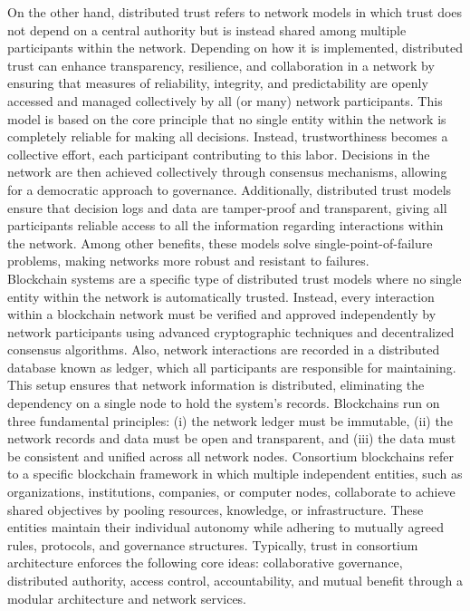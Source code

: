 \documentclass[conference]{IEEEtran}
\begin{document}
On the other hand, distributed trust refers to network models in which trust does not depend on a central authority but is instead shared among multiple participants within the network. Depending on how it is implemented, distributed trust can enhance transparency, resilience, and collaboration in a network by ensuring that measures of reliability, integrity, and predictability are openly accessed and managed collectively by all (or many) network participants. This model is based on the core principle that no single entity within the network is completely reliable for making all decisions. Instead, trustworthiness becomes a collective effort, each participant contributing to this labor. Decisions in the network are then achieved collectively through consensus mechanisms, allowing for a democratic approach to governance. Additionally, distributed trust models ensure that decision logs and data are tamper-proof and transparent, giving all participants reliable access to all the information regarding interactions within the network. Among other benefits, these models solve single-point-of-failure problems, making networks more robust and resistant to failures. \\

Blockchain systems are a specific type of distributed trust models where no single entity within the network is automatically trusted. Instead, every interaction within a blockchain network must be verified and approved independently by network participants using advanced cryptographic techniques and decentralized consensus algorithms. Also, network interactions are recorded in a distributed database known as ledger, which all participants are responsible for maintaining. This setup ensures that network information is distributed, eliminating the dependency on a single node to hold the system's records. Blockchains run on three fundamental principles: (i) the network ledger must be immutable, (ii) the network records and data must be open and transparent, and (iii) the data must be consistent and unified across all network nodes. Consortium blockchains refer to a specific blockchain framework in which multiple independent entities, such as organizations, institutions, companies, or computer nodes, collaborate to achieve shared objectives by pooling resources, knowledge, or infrastructure. These entities maintain their individual autonomy while adhering to mutually agreed rules, protocols, and governance structures. Typically, trust in consortium architecture enforces the following core ideas: collaborative governance, distributed authority, access control, accountability, and mutual benefit through a modular architecture and network services.\\
\end{document}
